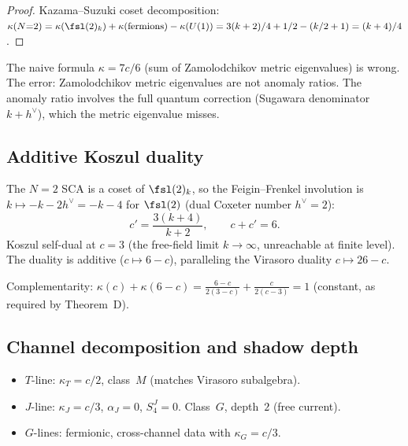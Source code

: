 \begin{proof}
Kazama--Suzuki coset decomposition:
$\kappa(N{=}2) = \kappa(\fsl(2)_k) + \kappa(\text{fermions})
- \kappa(U(1)) = 3(k+2)/4 + 1/2 - (k/2+1) = (k+4)/4$.
\end{proof}

The naive formula $\kappa = 7c/6$ (sum of Zamolodchikov metric
eigenvalues) is wrong. The error: Zamolodchikov metric
eigenvalues are not anomaly ratios. The anomaly ratio involves
the full quantum correction (Sugawara denominator $k + h^\vee$),
which the metric eigenvalue misses.


\subsection{Additive Koszul duality}
\label{subsec:comp-n2-koszul}

The $N{=}2$ SCA is a coset of $\fsl(2)_k$, so the Feigin--Frenkel
involution is $k \mapsto -k - 2h^\vee = -k - 4$ for $\fsl(2)$
(dual Coxeter number $h^\vee = 2$):
\[
 c' = \frac{3(k+4)}{k+2}, \qquad c + c' = 6.
\]
Koszul self-dual at $c = 3$ (the free-field limit
$k \to \infty$, unreachable at finite level).
The duality is additive ($c \mapsto 6 - c$), paralleling
the Virasoro duality $c \mapsto 26 - c$.

Complementarity:
$\kappa(c) + \kappa(6 - c) = \frac{6 - c}{2(3 - c)} + \frac{c}{2(c - 3)} = 1$
(constant, as required by Theorem~D).


\subsection{Channel decomposition and shadow depth}
\label{subsec:comp-n2-shadow}

\begin{itemize}
\item $T$-line: $\kappa_T = c/2$, class~$M$ (matches
 Virasoro subalgebra).
\item $J$-line: $\kappa_J = c/3$, $\alpha_J = 0$, $S_4^J = 0$.
 Class~$G$, depth~$2$ (free current).
\item $G$-lines: fermionic, cross-channel data with
 $\kappa_G = c/3$.
\end{itemize}

